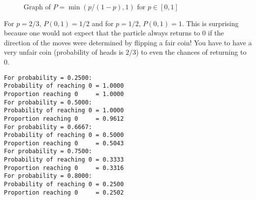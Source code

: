 \begin{figure}[tb]
\begin{center}
\end{center}
\caption{Graph of $P=\min(p/(1-p),1)$ for $p\in [0,1]$}\label{f.ruin2}
\end{figure}
For $p=2/3$, $P(0,1)=1/2$ and for $p=1/2$, $P(0,1)=1$. This is surprising because one would not expect that the particle always returns to $0$ if the direction of the moves were determined by flipping a fair coin! You have to have a very unfair coin (probability of heads is $2/3$) to even the chances of returning to $0$.

\sml{}
\begin{verbatim}
For probability = 0.2500:
Probability of reaching 0 = 1.0000
Proportion reaching 0     = 1.0000
For probability = 0.5000:
Probability of reaching 0 = 1.0000
Proportion reaching 0     = 0.9612
For probability = 0.6667:
Probability of reaching 0 = 0.5000
Proportion reaching 0     = 0.5043
For probability = 0.7500:
Probability of reaching 0 = 0.3333
Proportion reaching 0     = 0.3316
For probability = 0.8000:
Probability of reaching 0 = 0.2500
Proportion reaching 0     = 0.2502
\end{verbatim}


